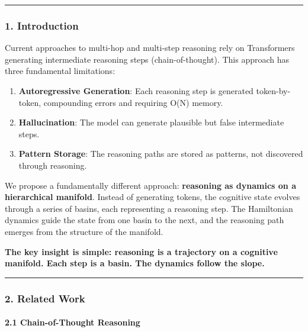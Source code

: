 \documentclass[
  11pt,
  a4paper,
]{article}
\providecommand{\tightlist}{%
  \setlength{\itemsep}{0pt}\setlength{\parskip}{0pt}}
\begin{document}
\begin{center}\rule{0.5\linewidth}{0.5pt}\end{center}

\subsubsection{1. Introduction}\label{introduction-4}

Current approaches to multi-hop and multi-step reasoning rely on
Transformers generating intermediate reasoning steps (chain-of-thought).
This approach has three fundamental limitations:

\begin{enumerate}
\def\labelenumi{\arabic{enumi}.}
\tightlist
\item
  \textbf{Autoregressive Generation}: Each reasoning step is generated
  token-by-token, compounding errors and requiring O(N) memory.
\item
  \textbf{Hallucination}: The model can generate plausible but false
  intermediate steps.
\item
  \textbf{Pattern Storage}: The reasoning paths are stored as patterns,
  not discovered through reasoning.
\end{enumerate}

We propose a fundamentally different approach: \textbf{reasoning as
dynamics on a hierarchical manifold}. Instead of generating tokens, the
cognitive state evolves through a series of basins, each representing a
reasoning step. The Hamiltonian dynamics guide the state from one basin
to the next, and the reasoning path emerges from the structure of the
manifold.

\textbf{The key insight is simple: reasoning is a trajectory on a
cognitive manifold. Each step is a basin. The dynamics follow the
slope.}

\begin{center}\rule{0.5\linewidth}{0.5pt}\end{center}

\subsubsection{2. Related Work}\label{related-work-1}

\paragraph{2.1 Chain-of-Thought
Reasoning}\label{chain-of-thought-reasoning}
\end{document}
